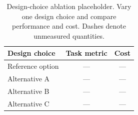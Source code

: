 \begin{table}[!t]
  \centering
  \caption{Design-choice ablation placeholder. Vary one design choice
  and compare performance and cost. Dashes denote unmeasured quantities.}
  \label{tab:design_ablation}
  \begin{tabular}{lcc}
    \toprule
    Design choice & Task metric & Cost \\
    \midrule
    Reference option & --- & --- \\
    Alternative A & --- & --- \\
    Alternative B & --- & --- \\
    Alternative C & --- & --- \\
    \bottomrule
  \end{tabular}
\end{table}
